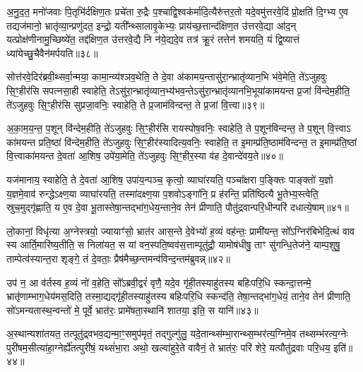 अ॒नु॒द॒त॒ मनो॑जवाः पि॒तृभि॑र्दक्षिण॒तः प्रचे॑ता रु॒द्रैः प॒श्चाद्वि॒श्वक॑र्मादि॒त्यैरु॑त्तर॒तो यदे॒वमु॑त्तरवे॒दिं प्रो॒क्षति॑ दि॒ग्भ्य ए॒व तद्यज॑मानो॒ भ्रातृ॑व्या॒न्प्रणु॑दत॒ इन्द्रो॒ यती᳚न्थ्सालावृ॒केभ्यः॒ प्राय॑च्छ॒त्तान्द॑क्षिण॒त उ॑त्तरवे॒द्या आ॑द॒न् यत्प्रोक्ष॑णीनामु॒च्छिष्ये॑त॒ तद्द॑क्षिण॒त उ॑त्तरवे॒द्यै नि न॑ये॒द्यदे॒व तत्र॑ क्रू॒रं तत्तेन॑ शमयति॒ यं द्वि॒ष्यात्तं ध्या॑येच्छु॒चैवैन॑मर्पयति॥३८॥

{\anuvakamend[{मि॒मी॒ते॒ नाम॑ ध्रु॒वा\-ऽप॑ शु॒चा त्रीणि॑ च}]}%

सोत्त॑रवे॒दिर॑ब्रवी॒थ्सर्वा॒न्मया॒ कामा॒न्व्य॑श्ञव॒थेति॒ ते दे॒वा अ॑कामय॒न्तासु॑रा॒न्भ्रातृ॑व्यान॒भि भ॑वे॒मेति॒ ते॑\-ऽजुहवुः सि॒ꣳ॒हीर॑सि सपत्नसा॒ही स्वाहेति॒ ते\-ऽसु॑रा॒न्भ्रातृ॑व्यान॒भ्य॑भव॒न्ते\-ऽसु॑रा॒न्भ्रातृ॑व्यानभि॒भूया॑कामयन्त प्र॒जां वि॑न्देम॒हीति॒ ते॑\-ऽजुहवुः सि॒ꣳ॒हीर॑सि सुप्रजा॒वनिः॒ स्वाहेति॒ ते प्र॒जाम॑विन्दन्त॒ ते प्र॒जां वि॒त्त्वा॥३९॥

अ॒का॒म॒य॒न्त॒ प॒शून् वि॑न्देम॒हीति॒ ते॑\-ऽजुहवुः सि॒ꣳ॒हीर॑सि रायस्पोष॒वनिः॒ स्वाहेति॒ ते प॒शून॑विन्दन्त॒ ते प॒शून् वि॒त्त्वा\-ऽ का॑मयन्त प्रति॒ष्ठां वि॑न्देम॒हीति॒ ते॑\-ऽजुहवुः सि॒ꣳ॒हीर॑स्यादित्य॒वनिः॒ स्वाहेति॒ त इ॒माम्प्र॑ति॒ष्ठाम॑विन्दन्त॒ त इ॒माम्प्र॑ति॒ष्ठां वि॒त्त्वाका॑मयन्त दे॒वता॑ आ॒शिष॒ उपे॑या॒मेति॒ ते॑\-ऽजुहवुः सि॒ꣳ॒हीर॒स्या व॑ह दे॒वान्दे॑वय॒ते॥४०॥

यज॑मानाय॒ स्वाहेति॒ ते दे॒वता॑ आ॒शिष॒ उपा॑य॒न्पञ्च॒ कृत्वो॒ व्याघा॑रयति॒ पञ्चा᳚क्षरा प॒ङ्क्तिः पाङ्क्तो॑ य॒ज्ञो य॒ज्ञमे॒वाव॑ रुन्द्धे\-ऽक्ष्ण॒या व्याघा॑रयति॒ तस्मा॑दक्ष्ण॒या प॒शवो\-ऽङ्गा॑नि॒ प्र ह॑रन्ति॒ प्रति॑ष्ठित्यै भू॒तेभ्य॒स्त्वेति॒ स्रुच॒मुद्गृ॑ह्णाति॒ य ए॒व दे॒वा भू॒तास्तेषा॒न्तद्भा॑ग॒धेय॒न्ताने॒व तेन॑ प्रीणाति॒ पौतु॑द्रवान्परि॒धीन्परि॑ दधात्ये॒षाम्॥४१॥

लो॒कानां॒ विधृ॑त्या अ॒ग्नेस्त्रयो॒ ज्यायाꣳ॑सो॒ भ्रात॑र आस॒न्ते दे॒वेभ्यो॑ ह॒व्यं वह॑न्तः॒ प्रामी॑यन्त॒ सो᳚\-ऽग्निर॑बिभेदि॒त्थं वाव स्य आर्ति॒मारि॑ष्य॒तीति॒ स निला॑यत॒ स यां वन॒स्पति॒ष्वव॑स॒त्ताम्पूतु॑द्रौ॒ यामोष॑धीषु॒ ताꣳ सु॑गन्धि॒तेज॑ने॒ याम्प॒शुषु॒ ताम्पेत्व॑स्यान्त॒रा शृङ्गे॒ तं दे॒वताः॒ प्रैष॑मैच्छ॒न्तमन्व॑विन्द॒न्तम॑ब्रुवन्न्॥४२॥

उप॑ न॒ आ व॑र्तस्व ह॒व्यं नो॑ व॒हेति॒ सो᳚\-ऽब्रवी॒द्वरं॑ वृणै॒ यदे॒व गृ॑ही॒तस्याहु॑तस्य बहिःपरि॒धि स्कन्दा॒त्तन्मे॒ भ्रातृ॑णाम्भाग॒धेय॑मस॒दिति॒ तस्मा॒द्यद्गृ॑ही॒तस्याहु॑तस्य बहिःपरि॒धि स्कन्द॑ति॒ तेषा॒न्तद्भा॑ग॒धेयं॒ ताने॒व तेन॑ प्रीणाति॒ सो॑\-ऽमन्यतास्थ॒न्वन्तो॑ मे॒ पूर्वे॒ भ्रात॑रः॒ प्रामे॑षता॒स्थानि॑ शातया॒ इति॒ स यानि॑॥४३॥

अ॒स्थान्यशा॑तयत॒ तत्पूतु॑द्र्वभव॒द्यन्मा॒ꣳ॒समुप॑मृतं॒ तद्गुल्गु॑लु॒ यदे॒तान्थ्स॑म्भा॒रान्थ्स॒म्भर॑त्य॒ग्निमे॒व तथ्सम्भ॑रत्य॒ग्नेः पुरी॑षम॒सीत्या॑हा॒ग्नेर्\mbox{}ह्ये॑तत्पुरी॑षं॒ यथ्सं॑भा॒रा अथो॒ खल्वा॑हुरे॒ते वावैनं॒ ते भ्रात॑रः॒ परि॑ शेरे॒ यत्पौतु॑द्रवाः परि॒धय॒ इति॑॥४४॥

